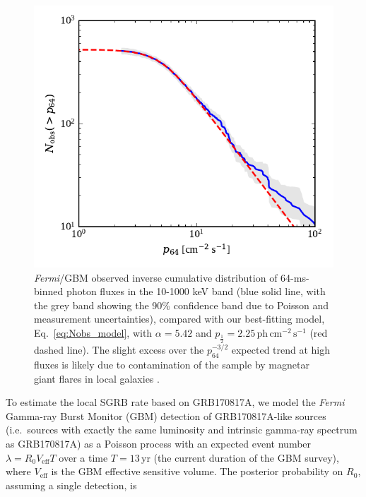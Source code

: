 \documentclass[]{aa}
\begin{document}
\begin{appendix}
\begin{figure}
 \centering
 \includegraphics[width=\columnwidth]{figures/logNlogS.pdf}
 \caption{\small\textit{Fermi}/GBM observed inverse cumulative distribution of 64-ms-binned photon fluxes in the 10-1000 keV band (blue solid line, with the grey band showing the 90\% confidence band due to Poisson and measurement uncertainties), compared with our best-fitting model, Eq.~\ref{eq:Nobs_model}, with $\alpha=5.42$ and $p_{\frac{1}{2}}=2.25\,\mathrm{ph\,cm^{-2}\,s^{-1}}$ (red dashed line). The slight excess over the $p_{64}^{-3/2}$ expected trend at high fluxes is likely due to contamination of the sample by magnetar giant flares in local galaxies \citep{Burns2021}. }
 \label{fig:logNlogS}
\end{figure}


To estimate the local SGRB rate based on GRB170817A, we model the \textit{Fermi} Gamma-ray Burst Monitor (GBM) detection of GRB170817A-like sources (i.e.~sources with exactly the same luminosity and intrinsic gamma-ray spectrum as GRB170817A) as a Poisson process with an expected event number $\lambda = R_\mathrm{0}V_\mathrm{eff}T$ over a time $T=13\,\mathrm{yr}$ (the current duration of the GBM survey), where $V_\mathrm{eff}$ is the GBM effective sensitive volume. The posterior probability on $R_\mathrm{0}$, assuming a single detection, is


\end{appendix}
\end{document}
